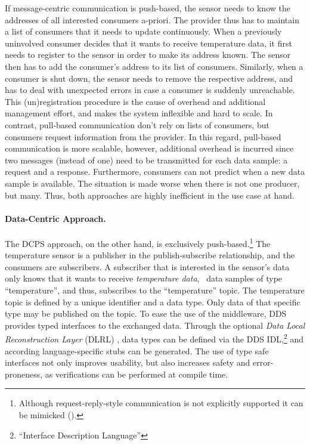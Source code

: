 If message-centric communication is push-based, the sensor needs to know the addresses of all interested consumers a-priori. The provider thus has to maintain a list of consumers that it needs to update continuously. When a previously uninvolved consumer decides that it wants to receive temperature data, it first needs to register to the sensor in order to make its address known. The sensor then has to add the consumer's address to its list of consumers. Similarly, when a consumer is shut down, the sensor needs to remove the respective address, and has to deal with unexpected errors in case a consumer is suddenly unreachable. This (un)registration procedure is the cause of overhead and additional management effort, and makes the system inflexible and hard to scale. In contrast, pull-based communication don't rely on lists of consumers, but consumers request information from the provider. In this regard, pull-based communication is more scalable, however, additional overhead is incurred since two messages (instead of one) need to be transmitted for each data sample: a request and a response. Furthermore, consumers can not predict when a new data sample is available. The situation is made worse when there is not one producer, but many. Thus, both approaches are highly inefficient in the use case at hand.

\paragraph{Data-Centric Approach.} The DCPS approach, on the other hand, is exclusively push-based.\footnote{Although request-reply-style communication is not explicitly supported it can be mimicked (\cf {}).} The temperature sensor is a publisher in the publish-subscribe relationship, and the consumers are subscribers. A subscriber that is interested in the sensor's data only knows that it wants to receive \emph{temperature data}, \ie\ data samples of type ``temperature'', and thus, subscribes to the ``temperature'' topic. 
The temperature topic is defined by a unique identifier and a data type. Only data of that specific type may be published on the topic. To ease the use of the middleware, DDS provides typed interfaces to the exchanged data. Through the optional \emph{Data Local Reconstruction Layer} (DLRL) \cite{dlrl-1.4-standard}, data types can be defined via the DDS IDL,\footnote{``Interface Description Language''} and according language-specific stubs can be generated. The use of type safe interfaces not only improves usability, but also increases safety and error-proneness, as verifications can be performed at compile time.

